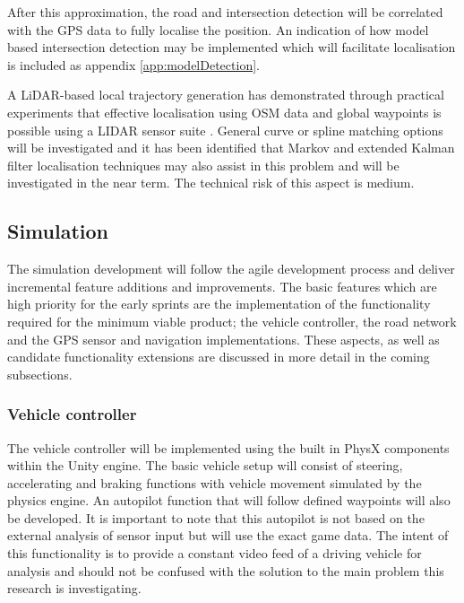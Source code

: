 \documentclass[]{aiaa-tc}%
\begin{document}
After this approximation, the road and intersection detection will be correlated with the GPS data to fully localise the position. An indication of how model based intersection detection \citep{modelBasedIntersection} may be implemented which will facilitate localisation is included as appendix \ref{app:modelDetection}.


A LiDAR-based local trajectory generation has demonstrated through practical experiments that effective localisation using OSM data and global waypoints is possible using a LIDAR sensor suite \cite{mitLocalNavDriving}. General curve or spline matching options will be investigated and it has been identified that Markov and extended Kalman filter localisation techniques may also assist in this problem \citep{probabalisticRobotics} and will be investigated in the near term. The technical risk of this aspect is medium.

\subsection{Simulation}

The simulation development will follow the agile development process and deliver incremental feature additions and improvements. The basic features which are high priority for the early sprints are the implementation of the functionality required for the minimum viable product; the vehicle controller, the road network and the GPS sensor and navigation implementations. These aspects, as well as candidate functionality extensions are discussed in more detail in the coming subsections.

\subsubsection{Vehicle controller}

The vehicle controller will be implemented using the built in PhysX components within the Unity engine. The basic vehicle setup will consist of steering, accelerating and braking functions with vehicle movement simulated by the physics engine. An autopilot function that will follow defined waypoints will also be developed. It is important to note that this autopilot is not based on the external analysis of sensor input but will use the exact game data. The intent of this functionality is to provide a constant video feed of a driving vehicle for analysis and should not be confused with the solution to the main problem this research is investigating.
\end{document}
